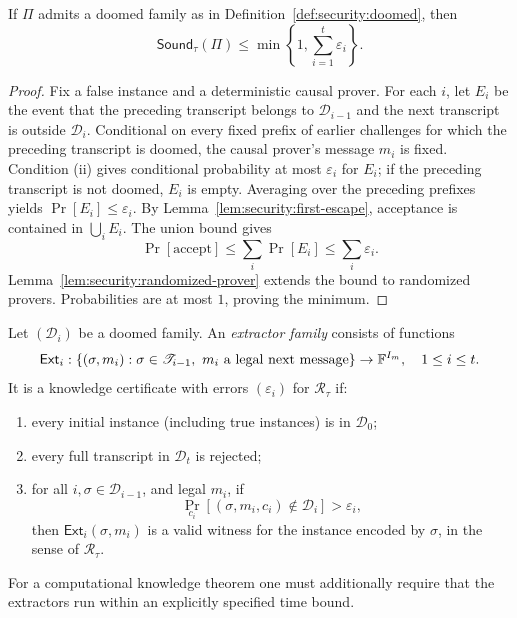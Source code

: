 \begin{theorem}\label{thm:security:rbr-sound}
If $\Pi$ admits a doomed family as in Definition~\ref{def:security:doomed}, then
\[
 \mathsf{Sound}_\tau(\Pi)\leq
 \min\left\{1,\sum_{i=1}^t\varepsilon_i\right\}.
\]
\end{theorem}
\begin{proof}
Fix a false instance and a deterministic causal prover. For each $i$, let $E_i$ be the event that the preceding transcript belongs to $\mathscr D_{i-1}$ and the next transcript is outside $\mathscr D_i$. Conditional on every fixed prefix of earlier challenges for which the preceding transcript is doomed, the causal prover's message $m_i$ is fixed. Condition (ii) gives conditional probability at most $\varepsilon_i$ for $E_i$; if the preceding transcript is not doomed, $E_i$ is empty. Averaging over the preceding prefixes yields $\Pr[E_i]\leq\varepsilon_i$. By Lemma~\ref{lem:security:first-escape}, acceptance is contained in $\bigcup_iE_i$. The union bound gives
\[
 \Pr[\mathrm{accept}]\leq\sum_i\Pr[E_i]\leq\sum_i\varepsilon_i.
\]
Lemma~\ref{lem:security:randomized-prover} extends the bound to randomized provers. Probabilities are at most $1$, proving the minimum.
\end{proof}

\begin{definition}\label{def:security:rbr-knowledge}
Let $(\mathscr D_i)$ be a doomed family. An \emph{extractor family} consists of functions
\[
 \mathsf{Ext}_i:
 \{(\sigma,m_i):\sigma\in\mathscr T_{i-1},\
                   m_i\text{ a legal next message}\}
 \to\mathbb{F}^{I_m},\quad 1\leq i\leq t.
\]
It is a knowledge certificate with errors $(\varepsilon_i)$ for $\mathcal R_\tau$ if:
\begin{enumerate}[label=\textup{(\roman*)}]
\item every initial instance (including true instances) is in $\mathscr D_0$;
\item every full transcript in $\mathscr D_t$ is rejected;
\item for all $i,\sigma\in\mathscr D_{i-1}$, and legal $m_i$, if
\[
 \Pr_{c_i}\left[(\sigma,m_i,c_i)\notin\mathscr D_i\right]>\varepsilon_i,
\]
then $\mathsf{Ext}_i(\sigma,m_i)$ is a valid witness for the instance encoded by $\sigma$, in the sense of $\mathcal R_\tau$.
\end{enumerate}
For a computational knowledge theorem one must additionally require that the extractors run within an explicitly specified time bound.
\end{definition}

